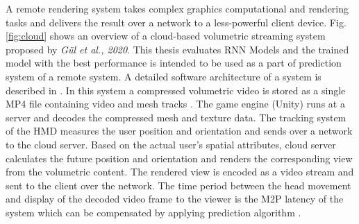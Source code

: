 A remote rendering system takes complex graphics computational and rendering tasks and delivers the result over a network to a less-powerful client device. Fig. \ref{fig:cloud}  shows an overview of a cloud-based volumetric streaming system proposed by \textit{Gül et al., 2020}. This thesis evaluates RNN Models and the trained model with the best performance is intended to be used as a part of prediction system of a remote system. A detailed software architecture of a system is described in \cite{serhan_cloud_streaming}. In this system a compressed volumetric video is stored as a single MP4 file containing video and mesh tracks \cite{serhan_kalman}. The game engine (Unity) runs at a server and decodes the compressed mesh and texture data. The tracking system of the HMD measures the user position and orientation and sends over a network to the cloud server. Based on the actual user's spatial attributes, cloud server calculates the future position and orientation and renders the corresponding view from the volumetric content. The rendered view is encoded as a video stream and sent to the client over the network. The time period between the head movement and display of the decoded video frame to the viewer is the M2P latency of the system which can be compensated by applying prediction algorithm \cite{serhan_kalman}.


